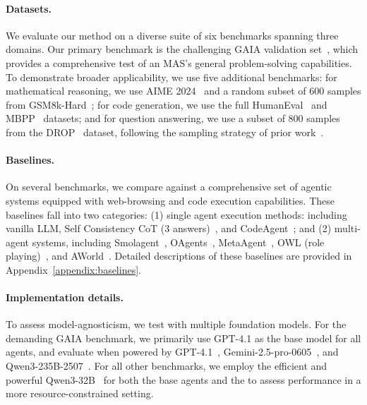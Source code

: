 \paragraph{Datasets.}
We evaluate our method on a diverse suite of six benchmarks spanning three domains.
Our primary benchmark is the challenging GAIA validation set~\citep{mialon2023gaiabenchmarkgeneralai}, which provides a comprehensive test of an MAS's general problem-solving capabilities.
To demonstrate broader applicability, we use five additional benchmarks: for mathematical reasoning, we use AIME 2024~\citep{HuggingFaceH4_AIME_2024} and a random subset of 600 samples from GSM8k-Hard~\citep{gao2022pal}; for code generation, we use the full HumanEval~\citep{chen2021evaluatinglargelanguagemodels} and MBPP~\citep{austin2021programsynthesislargelanguage} datasets; and for question answering, we use a subset of 800 samples from the DROP~\citep{dua-etal-2019-drop} dataset, following the sampling strategy of prior work~\citep{zhang2025aflowautomatingagenticworkflow}.

\paragraph{Baselines.}
On several benchmarks, we compare \method against a comprehensive set of agentic systems equipped with web-browsing and code execution capabilities.
These baselines fall into two categories: (1) single agent execution methods: including vanilla LLM, Self Consistency CoT (3 answers)~\citep{wang2023selfconsistencyimproveschainthought}, and CodeAgent~\citep{smolagents}; and (2) multi-agent systems, including Smolagent~\citep{smolagents}, OAgents~\citep{zhu2025oagentsempiricalstudybuilding}, MetaAgent~\citep{zhang2025metaagentautomaticallyconstructingmultiagent}, OWL (role playing)~\citep{hu2025owl}, and AWorld~\citep{xie2025profileawaremaneuveringdynamicmultiagent,yu2025aworldorchestratingtrainingrecipe}. 
Detailed descriptions of these baselines are provided in Appendix~\ref{appendix:baselines}.

\paragraph{Implementation details.}
To assess model-agnosticism, we test \method with multiple foundation models.
For the demanding GAIA benchmark, we primarily use GPT-4.1 as the base model for all agents, and evaluate \method when powered by GPT-4.1~\citep{openai_gpt4.1_2025}, Gemini-2.5-pro-0605~\citep{comanici2025gemini25pushingfrontier}, and Qwen3-235B-2507~\citep{qwen3technicalreport}.
For all other benchmarks, we employ the efficient and powerful Qwen3-32B~\citep{qwen3technicalreport} for both the base agents and the \method to assess performance in a more resource-constrained setting.


